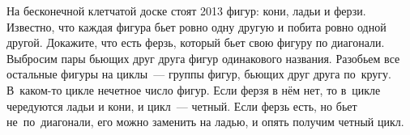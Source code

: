 \problem
На бесконечной клетчатой доске стоят 2013 фигур: кони, ладьи и ферзи.
Известно, что каждая фигура бьет ровно одну другую и побита ровно одной другой.
Докажите, что есть ферзь, который бьет свою фигуру по диагонали.
\solution
Выбросим пары бьющих друг друга фигур одинакового названия.
Разобьем все остальные фигуры на циклы~--- группы фигур, бьющих друг друга
по~кругу.
В~каком-то цикле нечетное число фигур.
Если ферзя в нём нет, то в~цикле чередуются ладьи и кони, и цикл~--- четный.
Если ферзь есть, но бьет не~по~диагонали, его можно заменить на ладью, и опять
получим четный цикл. 
\endproblem
